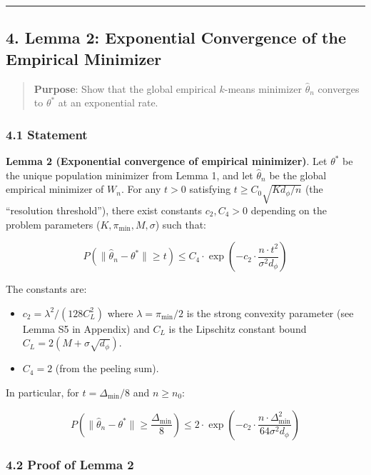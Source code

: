 \documentclass[
  12pt,
]{ctexart}
\providecommand{\tightlist}{%
  \setlength{\itemsep}{0pt}\setlength{\parskip}{0pt}}
\begin{document}
\begin{center}\rule{0.5\linewidth}{0.5pt}\end{center}

\subsection{4. Lemma 2: Exponential Convergence of the Empirical
Minimizer}\label{lemma-2-exponential-convergence-of-the-empirical-minimizer}

\begin{quote}
\textbf{Purpose}: Show that the global empirical \(k\)-means minimizer
\(\hat{\theta}_n\) converges to \(\theta^*\) at an exponential rate.
\end{quote}

\subsubsection{4.1 Statement}\label{statement-1}

\textbf{Lemma 2 (Exponential convergence of empirical minimizer)}. Let
\(\theta^*\) be the unique population minimizer from Lemma 1, and let
\(\hat{\theta}_n\) be the global empirical minimizer of \(W_n\). For any
\(t > 0\) satisfying \(t \geq C_0 \sqrt{K d_\phi / n}\) (the
``resolution threshold''), there exist constants \(c_2, C_4 > 0\)
depending on the problem parameters (\(K, \pi_{\min}, M, \sigma\)) such
that:

\[P\left(\|\hat{\theta}_n - \theta^*\| \geq t\right) \leq C_4 \cdot \exp\left(-c_2 \cdot \frac{n \cdot t^2}{\sigma^2 d_\phi}\right)\]

The constants are:

\begin{itemize}
\tightlist
\item
  \(c_2 = \lambda^2 / (128 C_L^2)\) where \(\lambda = \pi_{\min} / 2\)
  is the strong convexity parameter (see Lemma S5 in Appendix) and
  \(C_L\) is the Lipschitz constant bound
  \(C_L = 2(M + \sigma\sqrt{d_\phi})\).
\item
  \(C_4 = 2\) (from the peeling sum).
\end{itemize}

In particular, for \(t = \Delta_{\min}/8\) and \(n \geq n_0\):

\[P\left(\|\hat{\theta}_n - \theta^*\| \geq \frac{\Delta_{\min}}{8}\right) \leq 2 \cdot \exp\left(-c_2 \cdot \frac{n \cdot \Delta_{\min}^2}{64 \sigma^2 d_\phi}\right)\]

\subsubsection{4.2 Proof of Lemma 2}\label{proof-of-lemma-2}
\end{document}
